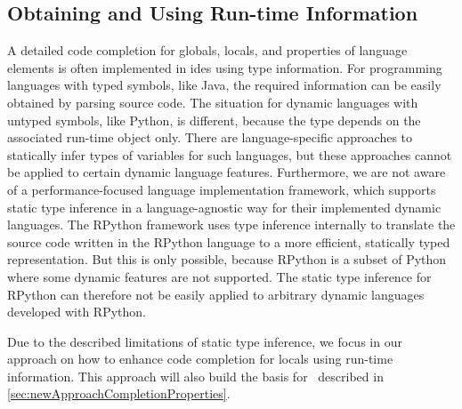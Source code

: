\documentclass[sigplan,10pt,review,anonymous]{acmart}
\begin{document}

\subsection{Obtaining and Using Run-time Information}
\label{sec:newApproachCompletionLocalsUsingRuntimeInfo}
    A detailed code completion for globals, locals, and properties of language elements is often implemented in \acp{ide} using type information. For programming languages with typed symbols, like Java, the required information can be easily obtained by parsing source code. The situation for dynamic languages with untyped symbols, like Python, is different, because the type depends on the associated run-time object only. There are language-specific approaches to statically infer types of variables for such languages, but these approaches cannot be applied to certain dynamic language features. Furthermore, we are not aware of a performance-focused language implementation framework, which supports static type inference in a language-agnostic way for their implemented dynamic languages. The RPython framework uses type inference internally to translate the source code written in the RPython language to a more efficient, statically typed representation. But this is only possible, because RPython is a subset of Python where some dynamic features are not supported. The static type inference for RPython can therefore not be easily applied to arbitrary dynamic languages developed with RPython.

    Due to the described limitations of static type inference, we focus in our approach on how to enhance code completion for locals using run-time information. This approach will also build the basis for \completionOfProperties~described in \autoref{sec:newApproachCompletionProperties}.
\end{document}
